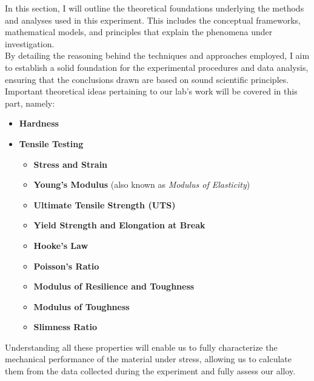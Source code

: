 \documentclass{article}
\begin{document}
    In this section, I will outline the theoretical foundations underlying the methods and analyses used in this experiment. This includes the conceptual frameworks, mathematical models, and principles that explain the phenomena under investigation.\\[8pt]
    By detailing the reasoning behind the techniques and approaches employed, I aim to establish a solid foundation for the experimental procedures and data analysis, ensuring that the conclusions drawn are based on sound scientific principles.\\[8pt]
    Important theoretical ideas pertaining to our lab's work will be covered in this part, namely:
    \begin{itemize}
        \item \textbf{Hardness}
        \item \textbf{Tensile Testing}
        \begin{itemize}
            \item \textbf{Stress and Strain}
            \item \textbf{Young's Modulus} (also known as \textit{Modulus of Elasticity})
            \item \textbf{Ultimate Tensile Strength (UTS)}
            \item \textbf{Yield Strength and Elongation at Break}
            \item \textbf{Hooke's Law}
            \item \textbf{Poisson's Ratio}
            \item \textbf{Modulus of Resilience and Toughness}
            \item \textbf{Modulus of Toughness}
            \item \textbf{Slimness Ratio}
        \end{itemize}
    \end{itemize}
    Understanding all these properties will enable us to fully characterize the mechanical performance of the material under stress, allowing us to calculate them from the data collected during the experiment and fully assess our alloy.
    \newpage
\end{document}
